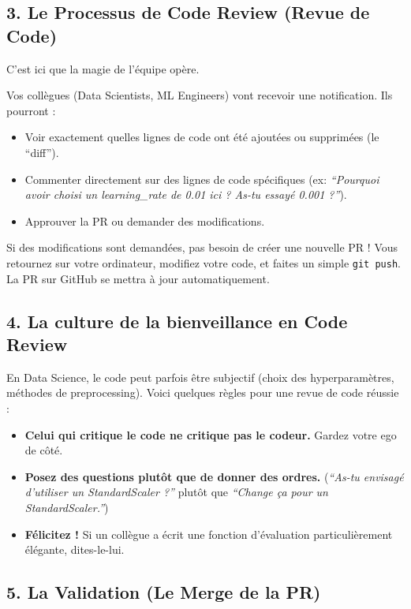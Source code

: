 \documentclass[
  letterpaper,
  DIV=11,
  numbers=noendperiod]{scrreprt}
\providecommand{\tightlist}{%
  \setlength{\itemsep}{0pt}\setlength{\parskip}{0pt}}
\begin{document}
\subsection{3. Le Processus de Code Review (Revue de
Code)}\label{le-processus-de-code-review-revue-de-code}

C'est ici que la magie de l'équipe opère.

Vos collègues (Data Scientists, ML Engineers) vont recevoir une
notification. Ils pourront :

\begin{itemize}
\item
  Voir exactement quelles lignes de code ont été ajoutées ou supprimées
  (le ``diff'').
\item
  Commenter directement sur des lignes de code spécifiques (ex:
  \emph{``Pourquoi avoir choisi un learning\_rate de 0.01 ici ? As-tu
  essayé 0.001 ?''}).
\item
  Approuver la PR ou demander des modifications.
\end{itemize}

Si des modifications sont demandées, pas besoin de créer une nouvelle PR
! Vous retournez sur votre ordinateur, modifiez votre code, et faites un
simple \texttt{git\ push}. La PR sur GitHub se mettra à jour
automatiquement.

\subsection{4. La culture de la bienveillance en Code
Review}\label{la-culture-de-la-bienveillance-en-code-review}

En Data Science, le code peut parfois être subjectif (choix des
hyperparamètres, méthodes de preprocessing). Voici quelques règles pour
une revue de code réussie :

\begin{itemize}
\tightlist
\item
  \textbf{Celui qui critique le code ne critique pas le codeur.} Gardez
  votre ego de côté.
\item
  \textbf{Posez des questions plutôt que de donner des ordres.}
  (\emph{``As-tu envisagé d'utiliser un StandardScaler ?''} plutôt que
  \emph{``Change ça pour un StandardScaler.''})
\item
  \textbf{Félicitez !} Si un collègue a écrit une fonction d'évaluation
  particulièrement élégante, dites-le-lui.
\end{itemize}

\subsection{5. La Validation (Le Merge de la
PR)}\label{la-validation-le-merge-de-la-pr}
\end{document}
